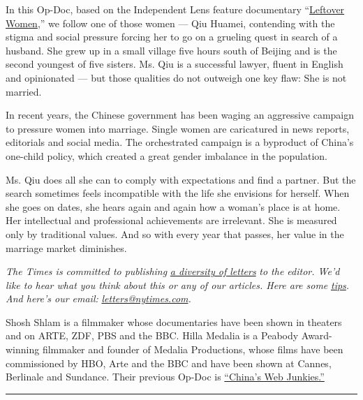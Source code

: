 In this Op-Doc, based on the Independent Lens feature documentary
``\href{http://www.pbs.org/independentlens/leftover-women/}{Leftover
Women},'' we follow one of those women --- Qiu Huamei, contending with
the stigma and social pressure forcing her to go on a grueling quest in
search of a husband. She grew up in a small village five hours south of
Beijing and is the second youngest of five sisters. Ms. Qiu is a
successful lawyer, fluent in English and opinionated --- but those
qualities do not outweigh one key flaw: She is not married.

In recent years, the Chinese government has been waging an aggressive
campaign to pressure women into marriage. Single women are caricatured
in news reports, editorials and social media. The orchestrated campaign
is a byproduct of China's one-child policy, which created a great gender
imbalance in the population.

Ms. Qiu does all she can to comply with expectations and find a partner.
But the search sometimes feels incompatible with the life she envisions
for herself. When she goes on dates, she hears again and again how a
woman's place is at home. Her intellectual and professional achievements
are irrelevant. She is measured only by traditional values. And so with
every year that passes, her value in the marriage market diminishes.

\emph{The Times is committed to publishing}
\href{https://www.nytimes.com/2019/01/31/opinion/letters/letters-to-editor-new-york-times-women.html}{\emph{a
diversity of letters}} \emph{to the editor. We'd like to hear what you
think about this or any of our articles. Here are some}
\href{https://help.nytimes.com/hc/en-us/articles/115014925288-How-to-submit-a-letter-to-the-editor}{\emph{tips}}\emph{.
And here's our email:}
\href{mailto:letters@nytimes.com}{\emph{letters@nytimes.com}}\emph{.}

Shosh Shlam is a filmmaker whose documentaries have been shown in
theaters and on ARTE, ZDF, PBS and the BBC. Hilla Medalia is a Peabody
Award-winning filmmaker and founder of Medalia Productions, whose films
have been commissioned by HBO, Arte and the BBC and have been shown at
Cannes, Berlinale and Sundance. Their previous Op-Doc is
\href{https://www.nytimes.com/2014/01/20/opinion/chinas-web-junkies.html}{``China's
Web Junkies.''}

\begin{center}\rule{0.5\linewidth}{\linethickness}\end{center}

